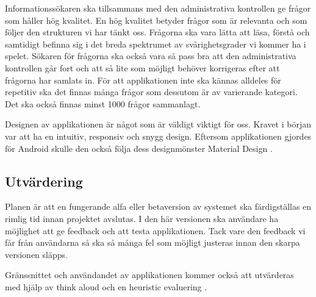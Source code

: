 \documentclass[a4paper, 11pt]{article}
\begin{document}
Informationssökaren ska tillsammans med den administrativa kontrollen ge frågor som håller hög kvalitet. En hög kvalitet betyder frågor som är relevanta och som följer den strukturen vi har tänkt oss. Frågorna ska vara lätta att läsa, förstå och samtidigt befinna sig i det breda spektrumet av svårighetsgrader vi kommer ha i spelet. Sökaren för frågorna ska också vara så pass bra att den administrativa kontrollen går fort och att så lite som möjligt behöver korrigeras efter att frågorna har samlats in. För att applikationen inte ska kännas alldeles för repetitiv ska det finnas många frågor som dessutom är av varierande kategori. Det ska också finnas minst 1000 frågor sammanlagt.

Designen av applikationen är något som är väldigt viktigt för oss. Kravet i början var att ha en intuitiv, responsiv och snygg design. Eftersom applikationen gjordes för Android skulle den också följa dess designmönster Material Design \cite{MaterialDesign}.

\subsection{Utvärdering}
Planen är att en fungerande alfa eller betaversion av systemet ska färdigställas en rimlig tid innan projektet avslutas. I den här versionen ska användare ha möjlighet att ge feedback och att testa applikationen. Tack vare den feedback vi får från användarna så ska så många fel som möjligt justeras innan den skarpa versionen släpps.

Gränssnittet och användandet av applikationen kommer också att utvärderas med hjälp av think aloud \cite{thinkaloud} och en heuristic evaluering \cite{heruistic}.

\newpage
\printbibliography[title={Referenser}]
\end{document}
